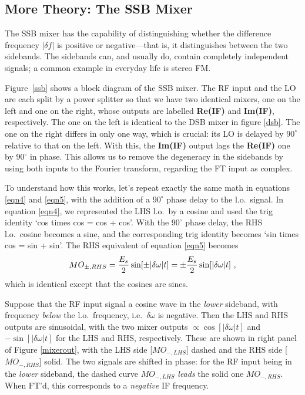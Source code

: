 \documentclass[12pt,preprint]{aastex}
\begin{document}
\subsection{More Theory: The SSB Mixer}

The SSB mixer has the capability of distinguishing whether the
difference frequency $|\delta f|$ is positive or negative---that
is, it distinguishes between the two sidebands.  The sidebands can, and
usually do, contain completely independent signals; a common example in
everyday life is stereo FM.

Figure\ \ref{ssb} shows a block diagram of the SSB mixer.  The RF input
and the LO are each split by a power splitter so that we have two
identical mixers, one on the left and one on the right, whose outputs
are labelled {\bf Re(IF)} and {\bf Im(IF)}, respectively. The one on
the left is identical to the DSB mixer in figure \ref{dsb}. The one on
the right differs in only one way, which is crucial: its LO is delayed
by $90^\circ$ relative to that on the left. With this, the {\bf Im(IF)}
output lags the {\bf Re(IF)} one by $90^\circ$ in phase. This allows us
to remove the degeneracy in the sidebands by using both inputs to the
Fourier transform, regarding the FT input as complex.

To understand how this works, let's repeat exactly the same math in
equations \ref{eqn4} and \ref{eqn5}, with the addition of a $90^\circ$
phase delay to the l.o.\ signal. In equation \ref{eqn4}, we represented
the LHS l.o.\ by a cosine and used the trig identity `cos times cos = cos +
cos'. With the $90^\circ$ phase delay, the RHS l.o.\ cosine becomes a sine,
and the corresponding trig identity becomes `sin times cos = sin +
sin'. The RHS equivalent of equation \ref{eqn5} becomes
%
\begin{equation}
MO_{\pm, RHS} = {E_s \over 2} \sin [\pm|\delta \omega | t] = \pm {E_s \over
  2}
   \sin [|\delta \omega | t] \ ,
\end{equation}
%
which is identical except that the cosines are sines.

Suppose that the RF input signal a cosine wave in the {\it lower}
sideband, with frequency {\it below} the l.o.\ frequency, i.e.\ $\delta
\omega$ is negative.  Then the LHS
and RHS outputs are sinusoidal, with the two mixer outputs $\propto \cos
[|\delta \omega| t]$ and $-\sin [|\delta \omega| t]$ for the LHS and
RHS, respectively.  These are shown in right panel of Figure
\ref{mixerout}, with the LHS side [$MO_{-,LHS}$] dashed and the RHS side
    [$MO_{-,RHS}$] solid. The two signals are shifted in phase: for the
    RF input being in the {\it lower} sideband, the dashed curve $MO_{-,
      LHS}$ {\it leads} the solid one $MO_{-, RHS}$. When FT'd, this
    corresponds to a {\it negative} IF frequency.
\end{document}
